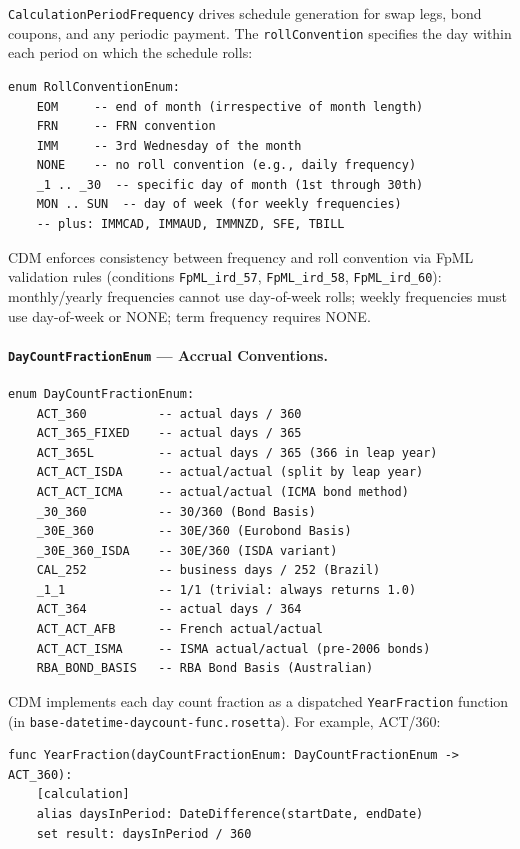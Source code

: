 \documentclass[11pt,a4paper]{article}
\begin{document}
\noindent \texttt{CalculationPeriodFrequency} drives schedule generation for swap legs, bond coupons, and any periodic payment. The \texttt{rollConvention} specifies the day within each period on which the schedule rolls:

\begin{lstlisting}
enum RollConventionEnum:
    EOM     -- end of month (irrespective of month length)
    FRN     -- FRN convention
    IMM     -- 3rd Wednesday of the month
    NONE    -- no roll convention (e.g., daily frequency)
    _1 .. _30  -- specific day of month (1st through 30th)
    MON .. SUN  -- day of week (for weekly frequencies)
    -- plus: IMMCAD, IMMAUD, IMMNZD, SFE, TBILL
\end{lstlisting}

\noindent CDM enforces consistency between frequency and roll convention via FpML validation rules (conditions \texttt{FpML\_ird\_57}, \texttt{FpML\_ird\_58}, \texttt{FpML\_ird\_60}): monthly/yearly frequencies cannot use day-of-week rolls; weekly frequencies must use day-of-week or NONE; term frequency requires NONE.

\paragraph{\texttt{DayCountFractionEnum} --- Accrual Conventions.}

\begin{lstlisting}
enum DayCountFractionEnum:
    ACT_360          -- actual days / 360
    ACT_365_FIXED    -- actual days / 365
    ACT_365L         -- actual days / 365 (366 in leap year)
    ACT_ACT_ISDA     -- actual/actual (split by leap year)
    ACT_ACT_ICMA     -- actual/actual (ICMA bond method)
    _30_360          -- 30/360 (Bond Basis)
    _30E_360         -- 30E/360 (Eurobond Basis)
    _30E_360_ISDA    -- 30E/360 (ISDA variant)
    CAL_252          -- business days / 252 (Brazil)
    _1_1             -- 1/1 (trivial: always returns 1.0)
    ACT_364          -- actual days / 364
    ACT_ACT_AFB      -- French actual/actual
    ACT_ACT_ISMA     -- ISMA actual/actual (pre-2006 bonds)
    RBA_BOND_BASIS   -- RBA Bond Basis (Australian)
\end{lstlisting}

\noindent CDM implements each day count fraction as a dispatched \texttt{YearFraction} function (in \texttt{base-datetime-daycount-func.rosetta}). For example, ACT/360:

\begin{lstlisting}
func YearFraction(dayCountFractionEnum: DayCountFractionEnum -> ACT_360):
    [calculation]
    alias daysInPeriod: DateDifference(startDate, endDate)
    set result: daysInPeriod / 360
\end{lstlisting}
\end{document}
